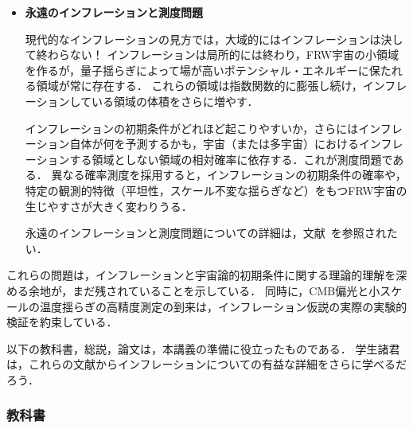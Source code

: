 \begin{itemize}
インフレーションに必要な初期条件の微調整が実際にどれほど深刻かは，いまだ十分に理解されていない永遠のインフレーションと測度問題から切り離して論じることはできない．

\item {\bf 永遠のインフレーションと測度問題}

現代的なインフレーションの見方では，大域的にはインフレーションは決して終わらない！
インフレーションは局所的には終わり，FRW宇宙の小領域を作るが，量子揺らぎによって場が高いポテンシャル・エネルギーに保たれる領域が常に存在する．
これらの領域は指数関数的に膨張し続け，インフレーションしている領域の体積をさらに増やす．

インフレーションの初期条件がどれほど起こりやすいか，さらにはインフレーション自体が何を予測するかも，宇宙（または多宇宙）におけるインフレーションする領域としない領域の相対確率に依存する．これが測度問題である．
異なる確率測度を採用すると，インフレーションの初期条件の確率や，特定の観測的特徴（平坦性，スケール不変な揺らぎなど）をもつFRW宇宙の生じやすさが大きく変わりうる．

永遠のインフレーションと測度問題についての詳細は，文献~\cite{Vilenkin:1983xq, Linde:1986fd, Linde:1993nz, Linde:1993xx, GarciaBellido:1993wn,Vilenkin:1994ua, Garriga:2005av, Bousso:2006ev, Linde:2007nm, Bousso:2008hz, DeSimone:2008if, Garriga:2008ks, Winitzki:2008jp, Linde:2008xf}を参照されたい．

\end{itemize}

これらの問題は，インフレーションと宇宙論的初期条件に関する理論的理解を深める余地が，まだ残されていることを示している．
同時に，CMB偏光と小スケールの温度揺らぎの高精度測定の到来は，インフレーション仮説の実際の実験的検証を約束している．



以下の教科書，総説，論文は，本講義の準備に役立ったものである．
学生諸君は，これらの文献からインフレーションについての有益な詳細をさらに学べるだろう．


\subsubsection*{教科書}


